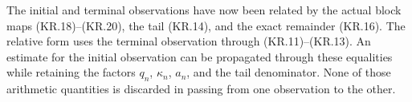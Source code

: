 The initial and terminal observations have now been related by
the actual block maps (KR.18)--(KR.20), the tail (KR.14), and the
exact remainder (KR.16).  The relative form uses the terminal
observation through (KR.11)--(KR.13).  An estimate for the initial
observation can be propagated through these equalities while
retaining the factors \(q_n\), \(\kappa_n\), \(a_n\), and the
tail denominator.  None of those arithmetic quantities is
discarded in passing from one observation to the other.
